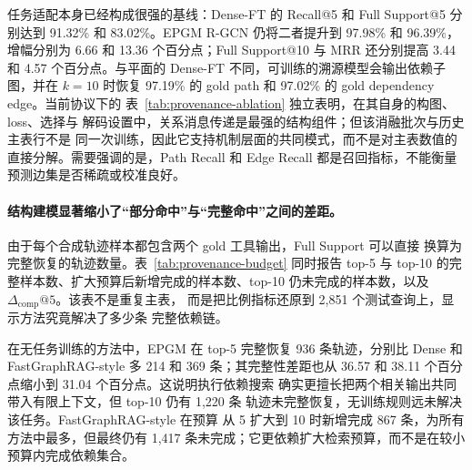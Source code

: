 任务适配本身已经构成很强的基线：Dense-FT 的 Recall@5 和 Full
Support@5 分别达到 91.32\% 和 83.02\%。EPGM R-GCN 仍将二者提升到
97.98\% 和 96.39\%，增幅分别为 6.66 和 13.36 个百分点；Full
Support@10 与 MRR 还分别提高 3.44 和 4.57 个百分点。与平面的
Dense-FT 不同，可训练的溯源模型会输出依赖子图，并在 $k=10$ 时恢复
97.19\% 的 gold path 和 97.02\% 的 gold dependency edge。当前协议下的
表~\ref{tab:provenance-ablation} 独立表明，在其自身的构图、loss、选择与
解码设置中，关系消息传递是最强的结构组件；但该消融批次与历史主表行不是
同一次训练，因此它支持机制层面的共同模式，而不是对主表数值的直接分解。需要强调的是，Path Recall
和 Edge Recall 都是召回指标，不能衡量预测边集是否稀疏或校准良好。

\paragraph{结构建模显著缩小了“部分命中”与“完整命中”之间的差距。}
由于每个合成轨迹样本都包含两个 gold 工具输出，Full Support 可以直接
换算为完整恢复的轨迹数量。表~\ref{tab:provenance-budget} 同时报告
top-5 与 top-10 的完整样本数、扩大预算后新增完成的样本数、top-10
仍未完成的样本数，以及 $\Delta_{\mathrm{comp}}@5$。该表不是重复主表，
而是把比例指标还原到 2,851 个测试查询上，显示方法究竟解决了多少条
完整依赖链。

\begin{table}[t]
\centering
\small
\setlength{\tabcolsep}{5pt}
\caption{合成执行轨迹上的完整支持与检索预算诊断。完整样本数的分母为
2,851；完整性差距的单位为百分点。}
\label{tab:provenance-budget}
\end{table}

在无任务训练的方法中，EPGM 在 top-5 完整恢复 936 条轨迹，分别比
Dense 和 FastGraphRAG-style 多 214 和 369 条；其完整性差距也从
36.57 和 38.11 个百分点缩小到 31.04 个百分点。这说明执行依赖搜索
确实更擅长把两个相关输出共同带入有限上下文，但 top-10 仍有 1,220 条
轨迹未完整恢复，无训练规则远未解决该任务。FastGraphRAG-style 在预算
从 5 扩大到 10 时新增完成 867 条，为所有方法中最多，但最终仍有 1,417
条未完成；它更依赖扩大检索预算，而不是在较小预算内完成依赖集合。

